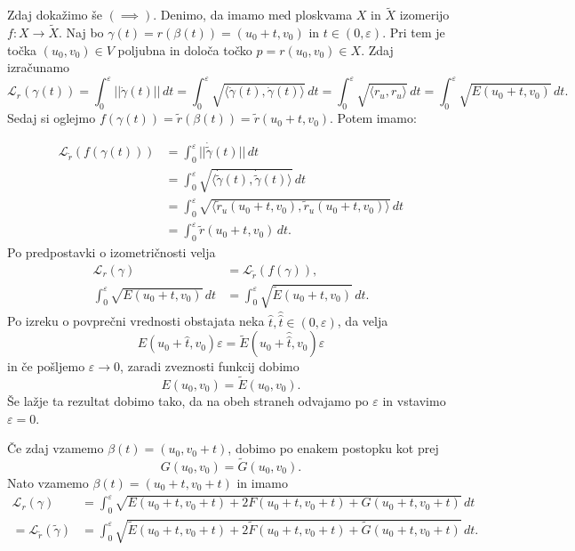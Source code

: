 Zdaj dokažimo še $(\implies)$. Denimo, da imamo med ploskvama $X$ in $\tilde{X}$
izomerijo $f: X \to  \tilde{X}.$ Naj bo $\gamma(t) = r(\beta(t)) =
(u_0 + t, v_0)$ in $t \in  (0, \varepsilon).$ Pri tem je točka $(u_0,
v_0) \in V$ poljubna in določa točko $p = r(u_0, v_0) \in  X$. Zdaj
izračunamo 
\begin{equation*} 
\mathcal{L}_r(\gamma(t)) = \int_{0}^{\varepsilon} \lvert\lvert
\dot{\gamma}(t) \rvert\rvert   \, dt = \int_{0}^{\varepsilon} \sqrt{\langle
\dot{\gamma}(t), \dot{\gamma}(t)  \rangle} \, dt =
\int_{0}^{\varepsilon} \sqrt{\langle r_u, r_u \rangle}   \, dt =
\int_{0}^{\varepsilon}\sqrt{  E(u_0 + t, v_0) }  \, dt. 
\end{equation*}
Sedaj si oglejmo $f(\gamma (t)) = \tilde{r}(\beta(t)) = \tilde{r}(u_0
+ t, v_0)$. Potem imamo:

\begin{align*}
  \mathcal{L}_{\tilde{r}}(f(\gamma(t))) &= \int_{0}^{\varepsilon} \lvert\lvert
  \dot{\tilde{\gamma}}(t) \rvert\rvert   \, dt  \\ &= 
  \int_{0}^{\varepsilon} \sqrt{\langle\dot{\tilde{\gamma}}(t), \dot{\tilde{\gamma}}(t)  \rangle} \, dt  \\ &=
  \int_{0}^{\varepsilon} \sqrt{\langle \tilde{r}_u(u_0 + t, v_0), \tilde{r}_u(u_0 + t, v_0) \rangle}   \, dt \\ &= 
  \int_{0}^{\varepsilon} \tilde{r}(u_0 + t, v_0)  \, dt. 
\end{align*}
Po predpostavki o izometričnosti velja 
\begin{align*}
    \mathcal{L}_r(\gamma) &= \mathcal{L}_{\tilde{r}}(f(\gamma)), \\
    \int_{0}^{\varepsilon} \sqrt{E(u_0 + t, v_0)}   \, dt  &= \int_{0}^{\varepsilon} \sqrt{\tilde{E}(u_0 + t, v_0)} \, dt.
\end{align*}
Po izreku o povprečni vrednosti obstajata neka $\hat{t}, \hat{\hat{t}} \in  (0, \varepsilon)$, da velja
\begin{equation*} E(u_0 + \hat{t} , v_0) \varepsilon = \tilde{E}(u_0 + \hat{\hat{t}} , v_0) \varepsilon\end{equation*}in če pošljemo $\varepsilon \to  0$,
zaradi zveznosti funkcij dobimo 
\begin{equation*} E(u_0, v_0) = \tilde{E}(u_0, v_0). \end{equation*}
Še lažje ta rezultat dobimo tako, da na obeh straneh odvajamo po $\varepsilon$ in vstavimo $\varepsilon = 0$.

Če zdaj vzamemo $\beta(t) = (u_0, v_0 + t)$, dobimo po enakem postopku kot prej 
\begin{equation*} G(u_0, v_0) = \tilde{G}(u_0, v_0). \end{equation*}
Nato vzamemo $\beta(t) = (u_0 + t, v_0 + t)$ in imamo
\begin{align*}
  \mathcal{L}_r(\gamma) &= \int_{0}^{\varepsilon} \sqrt{E(u_0 + t, v_0 + t) + 2F(u_0 + t, v_0 + t) + G(u_0 + t, v_0 + t)}   \, dt  \\
  = \mathcal{L}_{\tilde{r}}(\tilde{\gamma}) &= \int_{0}^{\varepsilon} \sqrt{\tilde{E}(u_0 + t, v_0 + t) + 2\tilde{F}(u_0 + t, v_0 + t) + \tilde{G}(u_0 + t, v_0 + t)}   \, dt. 
\end{align*}

